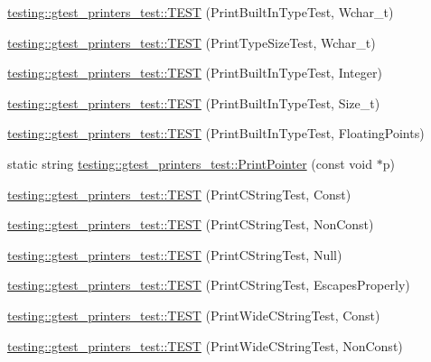 \begin{DoxyCompactItemize}
\item 
\hyperlink{namespacetesting_1_1gtest__printers__test_ab567ebd97eff0a4b9a20a5f5cb77d678}{testing\+::gtest\+\_\+printers\+\_\+test\+::\+T\+E\+ST} (Print\+Built\+In\+Type\+Test, Wchar\+\_\+t)
\item 
\hyperlink{namespacetesting_1_1gtest__printers__test_a705ec4c2886606a22194107397fceea6}{testing\+::gtest\+\_\+printers\+\_\+test\+::\+T\+E\+ST} (Print\+Type\+Size\+Test, Wchar\+\_\+t)
\item 
\hyperlink{namespacetesting_1_1gtest__printers__test_a278d53e99390c7b31ff531524fe5e86e}{testing\+::gtest\+\_\+printers\+\_\+test\+::\+T\+E\+ST} (Print\+Built\+In\+Type\+Test, Integer)
\item 
\hyperlink{namespacetesting_1_1gtest__printers__test_a991dc124d153742c3ca126b2fa9ccab5}{testing\+::gtest\+\_\+printers\+\_\+test\+::\+T\+E\+ST} (Print\+Built\+In\+Type\+Test, Size\+\_\+t)
\item 
\hyperlink{namespacetesting_1_1gtest__printers__test_acde0b28d177604ddb5e185d7b107f6f7}{testing\+::gtest\+\_\+printers\+\_\+test\+::\+T\+E\+ST} (Print\+Built\+In\+Type\+Test, Floating\+Points)
\item 
static string \hyperlink{namespacetesting_1_1gtest__printers__test_a647fd599f6c81755c3cff8ceeba1740d}{testing\+::gtest\+\_\+printers\+\_\+test\+::\+Print\+Pointer} (const void $\ast$p)
\item 
\hyperlink{namespacetesting_1_1gtest__printers__test_a6cd47b21ad8d9ac66ba57b5b6415a924}{testing\+::gtest\+\_\+printers\+\_\+test\+::\+T\+E\+ST} (Print\+C\+String\+Test, Const)
\item 
\hyperlink{namespacetesting_1_1gtest__printers__test_a89d9905fecee1b976c26d35498734dd4}{testing\+::gtest\+\_\+printers\+\_\+test\+::\+T\+E\+ST} (Print\+C\+String\+Test, Non\+Const)
\item 
\hyperlink{namespacetesting_1_1gtest__printers__test_ad29b97d58a4d1e5e8dd4d854f66b9e22}{testing\+::gtest\+\_\+printers\+\_\+test\+::\+T\+E\+ST} (Print\+C\+String\+Test, Null)
\item 
\hyperlink{namespacetesting_1_1gtest__printers__test_a140030b990011abab91d4c0b59f21edd}{testing\+::gtest\+\_\+printers\+\_\+test\+::\+T\+E\+ST} (Print\+C\+String\+Test, Escapes\+Properly)
\item 
\hyperlink{namespacetesting_1_1gtest__printers__test_a4caa1f81979cdc6f5ada95e01a4fae63}{testing\+::gtest\+\_\+printers\+\_\+test\+::\+T\+E\+ST} (Print\+Wide\+C\+String\+Test, Const)
\item 
\hyperlink{namespacetesting_1_1gtest__printers__test_a8812b5f088e13083ebb8a7e35fbcdae7}{testing\+::gtest\+\_\+printers\+\_\+test\+::\+T\+E\+ST} (Print\+Wide\+C\+String\+Test, Non\+Const)

\end{DoxyCompactItemize}
